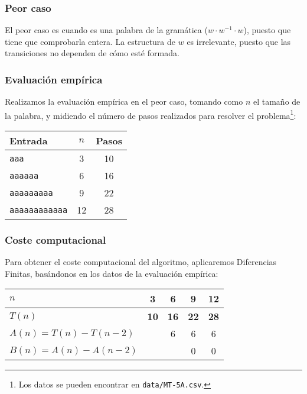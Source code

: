 

\subsubsection*{Peor caso}
El peor caso es cuando es una palabra de la gramática ($w \cdot w^{-1} \cdot w$), puesto que tiene que comprobarla entera. La estructura de $w$ es irrelevante, puesto que las transiciones no dependen de cómo esté formada.

\subsubsection*{Evaluación empírica}
Realizamos la evaluación empírica en el peor caso, tomando como $n$ el tamaño de la palabra, y midiendo el número de pasos realizados para resolver el problema\footnote{Los datos se pueden encontrar en \texttt{data/MT-5A.csv}.}:

\begin{table}[h]
    \centering
    \begin{tabular}{lcc}
        Entrada & $n$ & Pasos \\
        \hline
        \texttt{aaa}                &  3  & 10 \\
        \texttt{aaaaaa}             &  6  & 16 \\
        \texttt{aaaaaaaaa}          &  9  & 22 \\
        \texttt{aaaaaaaaaaaa}       & 12  & 28 \\
    \end{tabular}
\end{table}


\subsubsection*{Coste computacional}
Para obtener el coste computacional del algoritmo, aplicaremos Diferencias Finitas, basándonos en los datos de la evaluación empírica:

\begin{table}[H]
    \centering
    \begin{tabular}{|l|c|c|c|c|}
        \hline
        $n$    & \textbf{3}  & \textbf{6}  & \textbf{9}  & \textbf{12} \\ \hline
        $T(n)$ & \textbf{10} & \textbf{16} & \textbf{22} & \textbf{28} \\ \hline
        \hline
        $A(n) = T(n) - T(n-2)$ &   & 6 & 6 & 6 \\ \hline
        $B(n) = A(n) - A(n-2)$ &   &   & 0 & 0 \\ \hline
    \end{tabular}
    \label{tab:5A}
\end{table}

